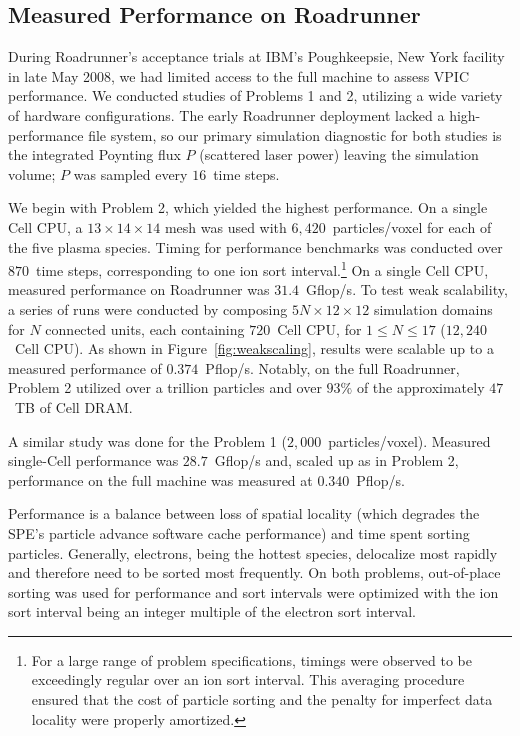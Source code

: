 \documentclass[journal,twoside]{IEEEtran}
\newcommand{\fig}[1]{Figure~\ref{fig:#1}}
\begin{document}
\subsection{Measured Performance on Roadrunner}

During Roadrunner's acceptance trials at IBM's Poughkeepsie, New York
facility in late May 2008, we had limited access to the full machine
to assess VPIC performance.  We conducted studies of Problems 1 and 2,
utilizing a wide variety of hardware configurations.  The early
Roadrunner deployment lacked a high-performance file system, so our
primary simulation diagnostic for both studies is the integrated
Poynting flux $P$ (scattered laser power) leaving the simulation
volume; $P$ was sampled every $16$~time steps.

We begin with Problem 2, which yielded the highest performance.  On a
single Cell CPU, a $13 \times 14 \times 14$ mesh was used with
$6,420$~particles/voxel for each of the five plasma species.  Timing
for performance benchmarks was conducted over $870$~time steps,
corresponding to one ion sort interval.\footnote{For a large range of
problem specifications, timings were observed to be exceedingly
regular over an ion sort interval.  This averaging procedure ensured
that the cost of particle sorting and the penalty for imperfect data
locality were properly amortized.}  On a single Cell CPU, measured
performance on Roadrunner was $31.4$~Gflop/s.  To test weak
scalability, a series of runs were conducted by composing $5N \times
12 \times 12$ simulation domains for $N$ connected units, each
containing $720$~Cell CPU, for $1 \le N \le 17$ ($12,240$~Cell CPU).
As shown in \fig{weakscaling}, results were scalable up to a measured
performance of $0.374$~Pflop/s.  Notably, on the full Roadrunner,
Problem 2 utilized over a trillion particles and over $93\%$ of the
approximately $47$~TB of Cell DRAM.

A similar study was done for the Problem 1 ($2,000$~particles/voxel).
Measured single-Cell performance was $28.7$~Gflop/s and, scaled up as
in Problem 2, performance on the full machine was measured at
$0.340$~Pflop/s.

Performance is a balance between loss of spatial locality (which
degrades the SPE's particle advance software cache performance) and
time spent sorting particles.  Generally, electrons, being the hottest
species, delocalize most rapidly and therefore need to be sorted most
frequently.  On both problems, out-of-place sorting was used for
performance and sort intervals were optimized with the ion sort
interval being an integer multiple of the electron sort interval.
\end{document}
